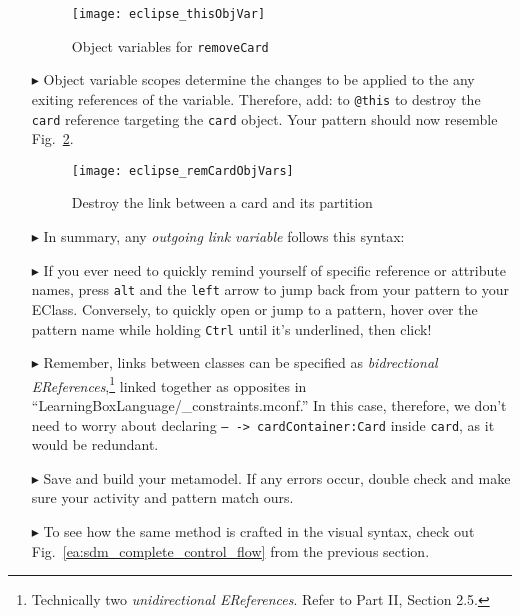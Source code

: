\begin{itemize}
\begin{figure}[htp]
\begin{center}
  \texttt{[image: eclipse\_thisObjVar]}
  \caption{Object variables for \texttt{removeCard}}
  \label{eclipse:remCardObjVar}
\end{center}
\end{figure}

\item[$\blacktriangleright$] Object variable scopes determine the changes to be applied to the any exiting references of the variable. Therefore, add:
 to \texttt{@this} to destroy the \texttt{card} reference targeting the \texttt{card} object. Your pattern should now resemble
Fig.~\ref{eclipse:deleteReference}. 

\begin{figure}[htp]
\begin{center}
    \texttt{[image: eclipse\_remCardObjVars]}
  \caption{Destroy the link between a card and its partition}
  \label{eclipse:deleteReference}
\end{center}
\end{figure}
\newpage

\item[$\blacktriangleright$] In summary, any \emph{outgoing link variable} follows this syntax:


\item[$\blacktriangleright$] If you ever need to quickly remind yourself of specific reference or attribute names, press \texttt{alt} and the \texttt{left}
arrow to jump back from your pattern to your EClass. Conversely, to quickly open
or jump to a pattern, hover over the pattern name while holding \texttt{Ctrl}
until it's underlined, then click!

\item[$\blacktriangleright$] Remember, links between classes can be specified as \emph{bidrectional EReferences},\footnote{Technically two
\emph{unidirectional EReferences}. Refer to Part II, Section 2.5.} linked together as opposites in ``LearningBoxLanguage/\_con\-straints.mconf.'' In this case,
therefore, we don't need to worry about declaring \texttt{-- -> cardContainer:Card} inside \texttt{card}, as it would be redundant.

\item[$\blacktriangleright$] Save and build your metamodel. If any errors occur, double check and make sure your activity and pattern match ours. 

\item[$\blacktriangleright$] To see how the same method is crafted in the visual syntax, check out Fig.~\ref{ea:sdm_complete_control_flow} from the previous
section.

\end{itemize}
